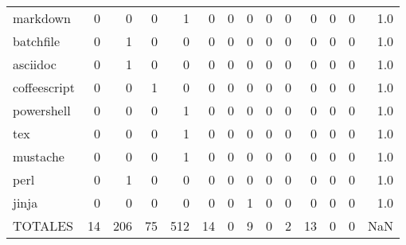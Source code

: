 \begin{tabular}{lrrrrrrrrrrrrr}
markdown      &        0 &       0 &          0 &               1 &                0 &       0 &          0 &         0 &         0 &      0 &             0 &         0 &      1.0 \\
batchfile     &        0 &       1 &          0 &               0 &                0 &       0 &          0 &         0 &         0 &      0 &             0 &         0 &      1.0 \\
asciidoc      &        0 &       1 &          0 &               0 &                0 &       0 &          0 &         0 &         0 &      0 &             0 &         0 &      1.0 \\
coffeescript  &        0 &       0 &          1 &               0 &                0 &       0 &          0 &         0 &         0 &      0 &             0 &         0 &      1.0 \\
powershell    &        0 &       0 &          0 &               1 &                0 &       0 &          0 &         0 &         0 &      0 &             0 &         0 &      1.0 \\
tex           &        0 &       0 &          0 &               1 &                0 &       0 &          0 &         0 &         0 &      0 &             0 &         0 &      1.0 \\
mustache      &        0 &       0 &          0 &               1 &                0 &       0 &          0 &         0 &         0 &      0 &             0 &         0 &      1.0 \\
perl          &        0 &       1 &          0 &               0 &                0 &       0 &          0 &         0 &         0 &      0 &             0 &         0 &      1.0 \\
jinja         &        0 &       0 &          0 &               0 &                0 &       0 &          1 &         0 &         0 &      0 &             0 &         0 &      1.0 \\
TOTALES       &       14 &     206 &         75 &             512 &               14 &       0 &          9 &         0 &         2 &     13 &             0 &         0 &      NaN \\
\bottomrule
\end{tabular}
